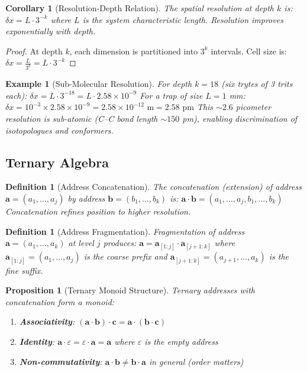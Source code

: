 \documentclass[twocolumn,10pt]{article}
\newtheorem{proposition}[theorem]{Proposition}
\newtheorem{corollary}[theorem]{Corollary}
\newtheorem{definition}[theorem]{Definition}
\newtheorem{example}[theorem]{Example}
\begin{document}
\begin{corollary}[Resolution-Depth Relation]
\label{cor:resolution}
The spatial resolution at depth $k$ is:
$
\delta x = L \cdot 3^{-k}
$
where $L$ is the system characteristic length. Resolution improves exponentially with depth.
\end{corollary}

\begin{proof}
At depth $k$, each dimension is partitioned into $3^k$ intervals. Cell size is:
$
\delta x = \frac{L}{3^k} = L \cdot 3^{-k}
$
\end{proof}

\begin{example}[Sub-Molecular Resolution]
\label{ex:resolution}
For depth $k = 18$ (six trytes of 3 trits each):
$
\delta x = L \cdot 3^{-18} = L \cdot 2.58 \times 10^{-9}
$
For a trap of size $L = 1$ mm:
$
\delta x = 10^{-3} \times 2.58 \times 10^{-9} = 2.58 \times 10^{-12} \text{ m} = 2.58 \text{ pm}
$
This $\sim 2.6$ picometer resolution is \emph{sub-atomic} (C–C bond length $\sim 150$ pm), enabling discrimination of isotopologues and conformers.
\end{example}



\subsection{Ternary Algebra}

\begin{definition}[Address Concatenation]
\label{def:concatenation}
The \emph{concatenation} (extension) of address $\mathbf{a} = (a_1, \ldots, a_j)$ by address $\mathbf{b} = (b_1, \ldots, b_k)$ is:
$
\mathbf{a} \cdot \mathbf{b} = (a_1, \ldots, a_j, b_1, \ldots, b_k)
$
Concatenation refines position to higher resolution.
\end{definition}

\begin{definition}[Address Fragmentation]
\label{def:fragmentation}
\emph{Fragmentation} of address $\mathbf{a} = (a_1, \ldots, a_k)$ at level $j$ produces:
$
\mathbf{a} = \mathbf{a}_{[1:j]} \cdot \mathbf{a}_{[j+1:k]}
$
where $\mathbf{a}_{[1:j]} = (a_1, \ldots, a_j)$ is the \emph{coarse prefix} and $\mathbf{a}_{[j+1:k]} = (a_{j+1}, \ldots, a_k)$ is the \emph{fine suffix}.
\end{definition}

\begin{proposition}[Ternary Monoid Structure]
\label{prop:monoid}
Ternary addresses with concatenation form a monoid:
\begin{enumerate}
    \item \textbf{Associativity}: $(\mathbf{a} \cdot \mathbf{b}) \cdot \mathbf{c} = \mathbf{a} \cdot (\mathbf{b} \cdot \mathbf{c})$
    \item \textbf{Identity}: $\mathbf{a} \cdot \varepsilon = \varepsilon \cdot \mathbf{a} = \mathbf{a}$ where $\varepsilon$ is the empty address
    \item \textbf{Non-commutativity}: $\mathbf{a} \cdot \mathbf{b} \neq \mathbf{b} \cdot \mathbf{a}$ in general (order matters)
\end{enumerate}
\end{proposition}
\end{document}
